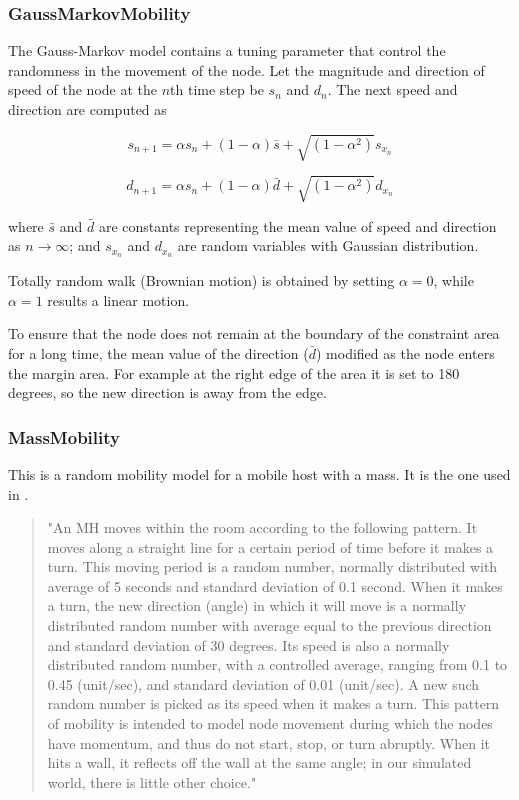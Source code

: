 \subsubsection*{GaussMarkovMobility}

The Gauss-Markov model contains a tuning parameter that control the randomness
in the movement of the node. Let the magnitude and direction of speed of the
node at the $n$th time step be $s_n$ and $d_n$. The next speed and direction are
computed as

$$ s_{n+1} = \alpha s_n + (1 - \alpha) \bar{s} + \sqrt{(1-\alpha^2)} s_{x_n} $$

$$ d_{n+1} = \alpha s_n + (1 - \alpha) \bar{d} + \sqrt{(1-\alpha^2)} d_{x_n} $$

where $\bar{s}$ and $\bar{d}$ are constants representing the mean value
of speed and direction as $n \to \infty$; and $s_{x_n}$ and $d_{x_n}$
are random variables with Gaussian distribution.

Totally random walk (Brownian motion) is obtained by setting $\alpha=0$,
while $\alpha=1$ results a linear motion.

To ensure that the node does not remain at the boundary of the constraint
area for a long time, the mean value of the direction ($\bar{d}$) modified
as the node enters the margin area. For example at the right edge of the
area it is set to 180 degrees, so the new direction is away from the edge.

\subsubsection*{MassMobility}

This is a random mobility model for a mobile host with
a mass. It is the one used in \cite{Perkins99optimizedsmooth}.

\begin{quote}
"An MH moves within the room according to the following pattern. It moves
along a straight line for a certain period of time before it makes a turn.
This moving period is a random number, normally distributed with average of
5 seconds and standard deviation of 0.1 second. When it makes a turn, the
new direction (angle) in which it will move is a normally distributed
random number with average equal to the previous direction and standard
deviation of 30 degrees. Its speed is also a normally distributed random
number, with a controlled average, ranging from 0.1 to 0.45 (unit/sec), and
standard deviation of 0.01 (unit/sec). A new such random number is picked
as its speed when it makes a turn. This pattern of mobility is intended to
model node movement during which the nodes have momentum, and thus do not
start, stop, or turn abruptly. When it hits a wall, it reflects off the
wall at the same angle; in our simulated world, there is little other
choice."
\end{quote}

